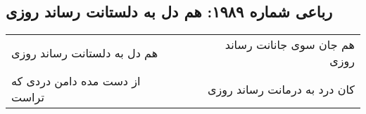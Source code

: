 \begin{center}
\section*{رباعی شماره ۱۹۸۹: هم دل به دلستانت رساند روزی}
\label{sec:1989}
\begin{longtable}{l p{0.5cm} r}
هم دل به دلستانت رساند روزی
&&
هم جان سوی جانانت رساند روزی
\\
از دست مده دامن دردی که تراست
&&
کان درد به درمانت رساند روزی
\\
\end{longtable}
\end{center}
